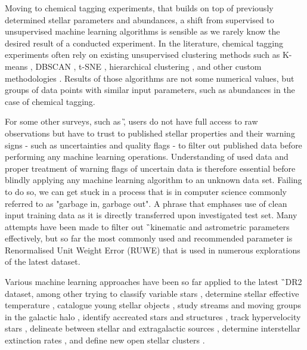 Moving to chemical tagging experiments, that builds on top of previously determined stellar parameters and abundances, a shift from supervised to unsupervised machine learning algorithms is sensible as we rarely know the desired result of a conducted experiment. In the literature, chemical tagging experiments often rely on existing unsupervised clustering methods such as K-means \cite{2015A&A...577A..47B, 2016ApJ...833..262H, 2018ApJ...860...70C}, DBSCAN \cite{2019MNRAS.487..871P}, t-SNE \cite{2018MNRAS.473.4612K, 2018A&A...619A.125A}, hierarchical clustering \cite{2017MNRAS.467.1140J, 2018A&A...618A..65B}, and other custom methodologies \cite{2019ApJ...887...73C}. Results of those algorithms are not some numerical values, but groups of data points with similar input parameters, such as abundances in the case of chemical tagging.

For some other surveys, such as \G, users do not have full access to raw observations but have to trust to published stellar properties and their warning signs - such as uncertainties and quality flags - to filter out published data before performing any machine learning operations. Understanding of used data and proper treatment of warning flags of uncertain data is therefore essential before blindly applying any machine learning algorithm to an unknown data set. Failing to do so, we can get stuck in a process that is in computer science commonly referred to as "garbage in, garbage out". A phrase that emphases use of clean input training data as it is directly transferred upon investigated test set. Many attempts have been made to filter out \G\ kinematic and astrometric parameters effectively, but so far the most commonly used and recommended parameter is Renormalised Unit Weight Error (RUWE) \cite{ruwe} that is used in numerous explorations of the latest dataset. 

Various machine learning approaches have been so far applied to the latest \G\ DR2 dataset, among other trying to classify variable stars \cite{2020MNRAS.493.2981B}, determine stellar effective temperature \cite{2019AJ....158...93B}, catalogue young stellar objects \cite{2019MNRAS.487.2522M}, study streams and moving groups in the galactic halo \cite{2017A&A...598A..58H, 2020MNRAS.492.1370B}, identify accreated stars and structures \cite{2019arXiv190706652O, 2019arXiv190707681N}, track hypervelocity stars \cite{2017MNRAS.470.1388M}, delineate between stellar and extragalactic sources \cite{2018RAA....18..118B, 2019MNRAS.490.5615B}, determine interstellar extinction rates \cite{2020AJ....159...84B}, and define new open stellar clusters \cite{2020A&A...635A..45C}.

